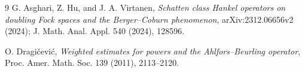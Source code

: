\documentclass[11pt]{article}
\begin{document}
\begin{thebibliography}{9}
G. Asghari, Z. Hu, and J. A. Virtanen,
\emph{Schatten class Hankel operators on doubling Fock spaces and the
Berger--Coburn phenomenon}, arXiv:2312.06656v2 (2024); J. Math. Anal. Appl.
540 (2024), 128596.

O. Dragi\v cevi\'c,
\emph{Weighted estimates for powers and the Ahlfors--Beurling operator},
Proc. Amer. Math. Soc. 139 (2011), 2113--2120.
\end{thebibliography}
\end{document}
